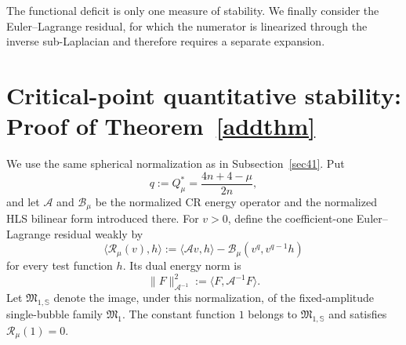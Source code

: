 \documentclass[10pt,a4paper]{amsart}
\begin{document}
The functional deficit is only one measure of stability. We finally consider the Euler--Lagrange residual, for which the numerator is linearized through the inverse sub-Laplacian and therefore requires a separate expansion.

\section{\texorpdfstring{{Critical-point quantitative stability: Proof of Theorem~\ref{addthm}}}{Critical-point quantitative stability: Proof of Theorem 3.4}}\label{sec7}

\begingroup
We use the same spherical normalization as in Subsection~\ref{sec41}. Put
\[
 q:=Q^{\ast}_{\mu}=\frac{4n+4-\mu}{2n},
\]
and let $\mathscr A$ and $\mathcal B_\mu$ be the normalized CR energy operator and the normalized HLS bilinear form introduced there. For $v>0$, define the coefficient-one Euler--Lagrange residual weakly by
\begin{equation}\label{sphere-residual}
 \big\langle\mathscr R_\mu(v),h\big\rangle
 :=\langle\mathscr Av,h\rangle-\mathcal B_\mu(v^q,v^{q-1}h)
\end{equation}
for every test function $h$. Its dual energy norm is
\[
 \|F\|_{\mathscr A^{-1}}^2:=\langle F,\mathscr A^{-1}F\rangle.
\]
Let $\mathfrak M_{1,\mathbb S}$ denote the image, under this normalization, of the fixed-amplitude single-bubble family $\mathfrak M_1$. The constant function $1$ belongs to $\mathfrak M_{1,\mathbb S}$ and satisfies $\mathscr R_\mu(1)=0$.
\end{document}
